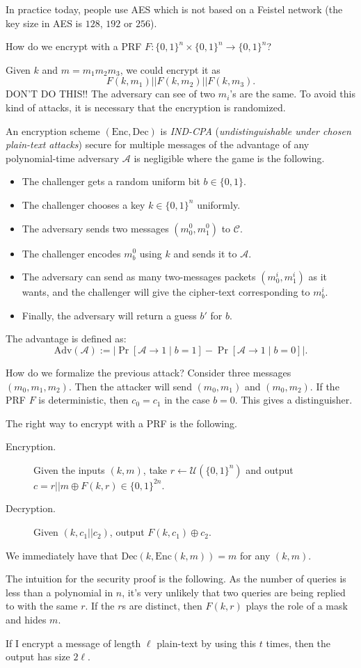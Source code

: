 \documentclass[./main]{subfiles}
\begin{document}
  In practice today, people use AES which is not based on a Feistel network (the key size in AES is $128$, $192$ or $256$).

  How do we encrypt with a PRF $F : \{0,1\}^n \times \{0,1\}^n \to \{0,1\}^n$?

  Given $k$ and $m = m_1 m_2 m_3$, we could encrypt it as 
  \[
  F(k, m_1) || F(k, m_2) || F(k, m_3)
  .\]
  DON'T DO THIS!!
  The adversary can see of two $m_i$'s are the same.
  To avoid this kind of attacks, it is necessary that the encryption is randomized.


  An encryption scheme $(\mathrm{Enc}, \mathrm{Dec})$ is \textit{IND-CPA} (\textit{undistinguishable under chosen plain-text attacks}) secure for multiple messages of the advantage of any polynomial-time adversary $\mathcal{A}$ is negligible where the game is the following.
  \begin{itemize}
    \item The challenger gets a random uniform bit $b \in \{0,1\}$.
    \item The challenger chooses a key $k \in \{0,1\}^n$ uniformly.
    \item The adversary sends two messages $(m^{0}_0, m^{0}_1)$ to $\mathcal{C}$.
    \item The challenger encodes $m^0_b$ using $k$ and sends it to $\mathcal{A}$.
    \item The adversary can send as many two-messages packets $(m_0^i, m_1^i)$ as it wants, and the challenger will give the cipher-text corresponding to $m^{i}_b$.
    \item Finally, the adversary will return a guess $b'$ for $b$.
  \end{itemize}

  The advantage is defined as:
  \[
    \mathrm{Adv}(\mathcal{A}) := \big| \Pr[\mathcal{A} \to 1  \mid b = 1] - \Pr[\mathcal{A} \to 1  \mid b = 0] \big|
  .\]


  How do we formalize the previous attack?
  Consider three messages $(m_0, m_1, m_2)$.
  Then the attacker will send $(m_0, m_1)$ and $(m_0, m_2)$.
  If the PRF $F$ is deterministic, then $c_0 = c_1$ in the case  $b = 0$.
  This gives a distinguisher.


  The right way to encrypt with a PRF is the following.
  \begin{description}
    \item[Encryption.]
      Given the inputs $(k,m)$, take  $r \gets \mathcal{U}(\{0,1\}^n)$ and output $c = r || m \oplus F(k, r) \in \{0,1\}^{2n}$.
    \item[Decryption.]
      Given $(k, c_1 || c_2)$, output $F(k, c_1) \oplus c_2$.
  \end{description}

  We immediately have that $\mathrm{Dec}(k, \mathrm{Enc}(k, m)) = m$ for any $(k, m)$.

  The intuition for the security proof is the following.
  As the number of queries is less than a polynomial in $n$, it's very unlikely that two queries are being replied to with the same $r$.
  If the $r$s are distinct, then $F(k, r)$ plays the role of a mask and hides $m$.

  If I encrypt a message of length $\ell$ plain-text by using this $t$ times, then the output has size $2 \ell$.
\end{document}
